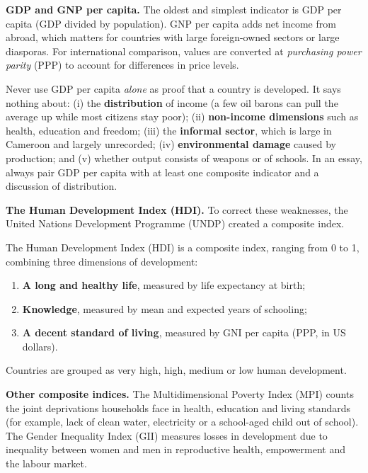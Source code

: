 \documentclass[11pt]{article}
\newcommand{\cle}[1]{{\popxbold\color{popdark}#1}}
\newcounter{popsec}
\newcounter{popsub}
\newcommand{\courssub}[1]{%
  \stepcounter{popsub}%
  \par\vspace{9pt}\noindent{\popxbold\fontsize{11.5}{13}\selectfont\color{popink}{\color{poporange}\thepopsec.\thepopsub}\hspace{6pt}#1}\par\nopagebreak\vspace{4pt}
}
\begin{document}
\courssub{Indicators of Development}

\textbf{GDP and GNP per capita.} The oldest and simplest indicator is \cle{GDP per capita} (GDP divided by population). \cle{GNP per capita} adds net income from abroad, which matters for countries with large foreign-owned sectors or large diasporas. For international comparison, values are converted at \emph{purchasing power parity} (PPP) to account for differences in price levels.

\begin{attention}
Never use GDP per capita \emph{alone} as proof that a country is developed. It says nothing about: (i) the \textbf{distribution} of income (a few oil barons can pull the average up while most citizens stay poor); (ii) \textbf{non-income dimensions} such as health, education and freedom; (iii) the \textbf{informal sector}, which is large in Cameroon and largely unrecorded; (iv) \textbf{environmental damage} caused by production; and (v) whether output consists of weapons or of schools. In an essay, always pair GDP per capita with at least one composite indicator and a discussion of distribution.
\end{attention}

\textbf{The Human Development Index (HDI).} To correct these weaknesses, the United Nations Development Programme (UNDP) created a composite index.

\begin{definition}
The \cle{Human Development Index} (HDI) is a composite index, ranging from 0 to 1, combining three dimensions of development:
\begin{enumerate}
\item \textbf{A long and healthy life}, measured by life expectancy at birth;
\item \textbf{Knowledge}, measured by mean and expected years of schooling;
\item \textbf{A decent standard of living}, measured by GNI per capita (PPP, in US dollars).
\end{enumerate}
Countries are grouped as very high, high, medium or low human development.
\end{definition}

\textbf{Other composite indices.} The \cle{Multidimensional Poverty Index} (MPI) counts the joint deprivations households face in health, education and living standards (for example, lack of clean water, electricity or a school-aged child out of school). The \cle{Gender Inequality Index} (GII) measures losses in development due to inequality between women and men in reproductive health, empowerment and the labour market.
\end{document}
